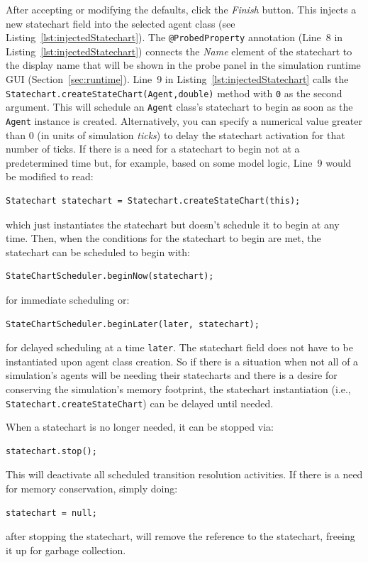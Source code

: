 \documentclass[11pt]{amsart}
\begin{document}
After accepting or modifying the defaults, click the \emph{Finish} button. This injects a new statechart field into the selected agent class (see Listing~\ref{lst:injectedStatechart}). The \texttt{@ProbedProperty} annotation (Line~8 in Listing~\ref{lst:injectedStatechart}) connects the \emph{Name} element of the statechart to the display name that will be shown in the probe panel in the simulation runtime GUI (Section~\ref{sec:runtime}). Line~9 in Listing~\ref{lst:injectedStatechart} calls the \texttt{Statechart.createStateChart(Agent,double)} method with \texttt{0} as the second argument. This will schedule an \texttt{Agent} class's statechart to begin as soon as the \texttt{Agent} instance  is created. Alternatively, you can specify a numerical value greater than 0 (in units of simulation \emph{ticks}) to delay the statechart activation for that number of ticks. If there is a need for a statechart to begin not at a predetermined time but, for example, based on some model logic, Line~9 would be modified to read:
\begin{verbatim}Statechart statechart = Statechart.createStateChart(this);\end{verbatim}
which just instantiates the statechart but doesn't schedule it to begin at any time. Then, when the conditions for the statechart to begin are met, the statechart can be scheduled to begin with:
\begin{verbatim}StateChartScheduler.beginNow(statechart);\end{verbatim}
for immediate scheduling or:
\begin{verbatim}StateChartScheduler.beginLater(later, statechart);\end{verbatim}
for delayed scheduling at a time \texttt{later}. The statechart field does not have to be instantiated upon agent class creation. So if there is a  situation when not all of a simulation's agents will be needing their statecharts and there is a desire for conserving the simulation's memory footprint, the statechart instantiation (i.e., \texttt{Statechart.createStateChart}) can be delayed until needed.

When a statechart is no longer needed, it can be stopped via:
\begin{verbatim}statechart.stop();\end{verbatim}
This will deactivate all scheduled transition resolution activities. If there is a need for memory conservation, simply doing:
\begin{verbatim}statechart = null;\end{verbatim}
after stopping the statechart, will remove the reference to the statechart, freeing it up for garbage collection.
\end{document}

